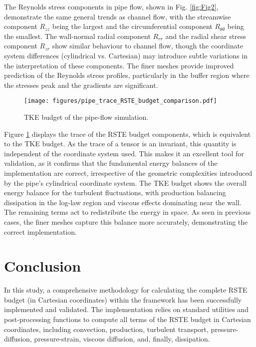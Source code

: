 The Reynolds stress components in pipe flow, shown in Fig. \ref{fig:Fig2}, demonstrate the same general trends as channel flow, with the streamwise component $R_{zz}$ being the largest and the circumferential component $R_{\theta\theta}$ being the smallest. The wall-normal radial component $R_{rr}$ and the radial shear stress component $R_{zr}$ show similar behaviour to channel flow, though the coordinate system differences (cylindrical vs. Cartesian) may introduce subtle variations in the interpretation of these components. The finer meshes provide improved prediction of the Reynolds stress profiles, particularly in the buffer region where the stresses peak and the gradients are significant.

\begin{figure}[ht]
    \centering
    \texttt{[image: figures/pipe\_trace\_RSTE\_budget\_comparison.pdf]}
    \caption{TKE budget of the pipe-flow simulation.}
    \label{fig:Fig3}
\end{figure}

Figure \ref{fig:Fig3} displays the trace of the RSTE budget components, which is equivalent to the TKE budget. As the trace of a tensor is an invariant, this quantity is independent of the coordinate system used. This makes it an excellent tool for validation, as it confirms that the fundamental energy balances of the implementation are correct, irrespective of the geometric complexities introduced by the pipe's cylindrical coordinate system. The TKE budget shows the overall energy balance for the turbulent fluctuations, with production balancing dissipation in the log-law region and viscous effects dominating near the wall.
The remaining terms act to redistribute the energy in space.
As seen in previous cases, the finer meshes capture this balance more accurately, demonstrating the correct implementation.

\clearpage

\section{Conclusion}
\label{sec:conclusions}

In this study, a comprehensive methodology for calculating the complete RSTE budget (in Cartesian coordinates) within the \OF framework has been successfully implemented and validated. The implementation relies on standard \OF utilities and post-processing functions to compute all terms of the RSTE budget in Cartesian coordinates, including convection, production, turbulent transport, pressure-diffusion, pressure-strain, viscous diffusion, and, finally, dissipation.

